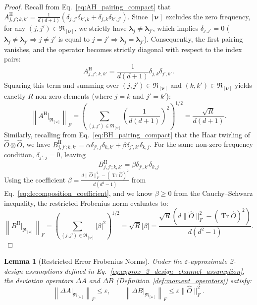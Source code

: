 \documentclass[%
 reprint,
 amsmath,amssymb,
 aps,
 pra,
]{revtex4-2}
\newtheorem{lemma}[theorem]{Lemma}
\theoremstyle{definition}
\begin{document}
\begin{proof}
Recall from Eq.~\eqref{eq:AH_pairing_compact} that $A^{\mathrm H}_{j,j';k,k'} = \frac{1}{d(d+1)} ( \delta_{j,j'}\delta_{k',k} + \delta_{j,k}\delta_{k',j'} )$. Since $[\bm{\nu}]$ excludes the zero frequency, for any $(j,j') \in \mathfrak{R}_{[\bm{\nu}]}$, we strictly have $\bm{\lambda}_j \neq \bm{\lambda}_{j'}$, which implies $\delta_{j,j'} = 0$ ($\bm{\lambda}_j \neq \bm{\lambda}_{j'}\Rightarrow j\neq j'$ is equal to $j= j'\Rightarrow\bm{\lambda}_j =\bm{\lambda}_{j'}$). Consequently, the first pairing vanishes, and the operator becomes strictly diagonal with respect to the index pairs:
\begin{equation}
A^{\mathrm H}_{j,j';k,k'} = \frac{1}{d(d+1)} \delta_{j,k}\delta_{j',k'}.
\end{equation}
Squaring this term and summing over $(j,j') \in \mathfrak{R}_{[\bm{\nu}]}$ and $(k,k') \in \mathfrak{R}_{[\bm{\nu}]}$ yields exactly $R$ non-zero elements (where $j=k$ and $j'=k'$):
\begin{equation}
\left\| A^{\mathrm{H}} |_{\mathfrak{R}_{[\bm{\nu}]}} \right\|_F = \left( \sum_{(j,j') \in \mathfrak{R}_{[\bm{\nu}]}} \left(\frac{1}{d(d+1)}\right)^2 \right)^{1/2} = \frac{\sqrt{R}}{d(d+1)}.
\end{equation}
Similarly, recalling from Eq.~\eqref{eq:BH_pairing_compact} that the Haar twirling of $\hat{O} \otimes \hat{O}$, we have $B^{\mathrm H}_{j,j';k,k'} = \alpha\delta_{j',j}\delta_{k,k'} + \beta\delta_{j',k'}\delta_{k,j}$. For the same non-zero frequency condition, $\delta_{j',j} = 0$, leaving
$$
B^{\mathrm H}_{j,j';k,k'} = \beta \delta_{j',k'}\delta_{k,j}
$$
Using the coefficient $\beta=\frac{d\|\hat{O}\|_F^2-(\operatorname{Tr} \hat{O})^2}{d\left(d^2-1\right)}$ from Eq.~\eqref{eq:decomposition_coefficient}, and we know $\beta\geq0$ from the Cauchy–Schwarz inequality, the restricted Frobenius norm evaluates to:
\begin{equation}
\left\| B^{\mathrm{H}} |_{\mathfrak{R}_{[\bm{\nu}]}} \right\|_F = \left( \sum_{(j,j') \in \mathfrak{R}_{[\bm{\nu}]}} |\beta|^2 \right)^{1/2} = \sqrt{R} |\beta|=\frac{ \sqrt{R}(d\|\hat{O}\|_F^2-(\operatorname{Tr} \hat{O})^2)}{d\left(d^2-1\right)}.
\end{equation}

\end{proof}

\begin{lemma}[Restricted Error Frobenius Norms]
\label{lemma:restricted_error_norm}
Under the $\varepsilon$-approximate 2-design assumptions defined in Eq.~\eqref{eq:approx_2_design_channel_assumption}, the deviation operators $\Delta A$ and $\Delta B$ (Definition~\ref{def:moment_operators}) satisfy:
\begin{equation}
\left\| \Delta A |_{\mathfrak{R}_{[\bm{\nu}]}} \right\|_F \leq \varepsilon, \qquad \left\| \Delta B |_{\mathfrak{R}_{[\bm{\nu}]}} \right\|_F \leq \varepsilon \|\hat{O}\|_F^2.
\end{equation}
\end{lemma}
\end{document}
